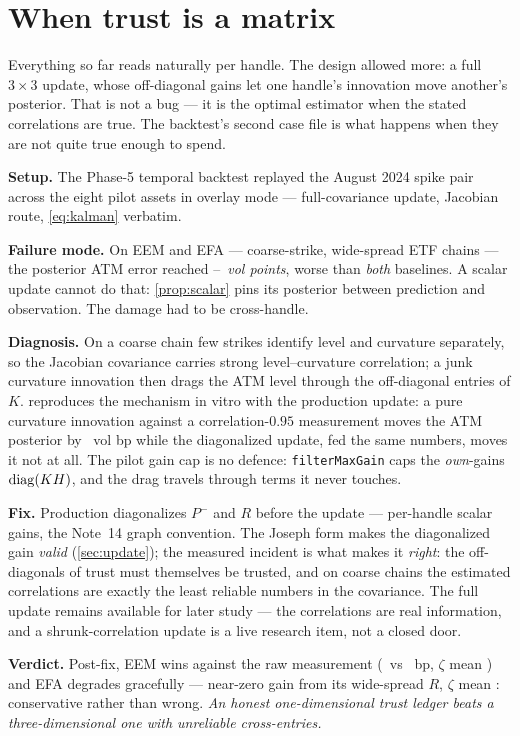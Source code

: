 \documentclass[11pt]{article}
\begin{document}
\section{When trust is a matrix}
\label{sec:matrix}

Everything so far reads naturally per handle.  The design allowed more:
a full $3\times3$ update, whose off-diagonal gains let one handle's
innovation move another's posterior.  That is not a bug --- it is the
optimal estimator when the stated correlations are true.  The backtest's
second case file is what happens when they are not quite true enough to
spend.

\begin{example}[title={Case file: the off-diagonal blow-up on coarse
chains}]
\textbf{Setup.}  The Phase-5 temporal backtest replayed the August 2024
spike pair across the eight pilot assets in overlay mode ---
full-covariance update, Jacobian route, \cref{eq:kalman} verbatim.

\textbf{Failure mode.}  On EEM and EFA --- coarse-strike, wide-spread
ETF chains --- the posterior ATM error reached
\ktrblowupminpts--\ktrblowupmaxpts\ \emph{vol points}, worse than
\emph{both} baselines.  A scalar update cannot do that:
\cref{prop:scalar} pins its posterior between prediction and
observation.  The damage had to be cross-handle.

\textbf{Diagnosis.}  On a coarse chain few strikes identify level and
curvature separately, so the Jacobian covariance carries strong
level--curvature correlation; a junk curvature innovation then drags
the ATM level through the off-diagonal entries of $K$.
 reproduces the mechanism in vitro with the
production update: a pure curvature innovation against a
correlation-$0.95$ measurement moves the ATM posterior by
\ktroffdiagdrag\ vol bp while the diagonalized update, fed the same
numbers, moves it not at all.  The pilot gain cap is no defence:
\texttt{filterMaxGain} caps the \emph{own}-gains $\operatorname{diag}(KH)$, and the
drag travels through terms it never touches.

\textbf{Fix.}  Production diagonalizes $P^-$ and $R$ before the update
--- per-handle scalar gains, the Note~14 graph convention.  The Joseph
form makes the diagonalized gain \emph{valid} (\cref{sec:update}); the
measured incident is what makes it \emph{right}: the off-diagonals of
trust must themselves be trusted, and on coarse chains the estimated
correlations are exactly the least reliable numbers in the covariance.
The full update remains available for later study --- the correlations
are real information, and a shrunk-correlation update is a live research
item, not a closed door.

\textbf{Verdict.}  Post-fix, EEM wins against the raw measurement
(\ktreempost\ vs \ktreemmeas\ bp, $\zeta$ mean \ktreemzeta) and EFA
degrades gracefully --- near-zero gain from its wide-spread $R$,
$\zeta$ mean \ktrefazeta: conservative rather than wrong.
\emph{An honest one-dimensional trust ledger beats a three-dimensional
one with unreliable cross-entries.}
\end{example}
\end{document}
